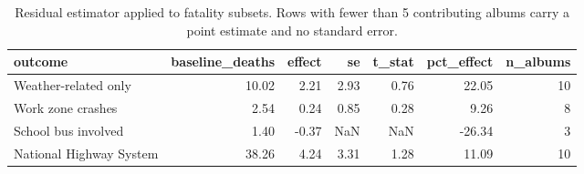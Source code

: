\begin{table}
\caption{Residual estimator applied to fatality subsets. Rows with fewer than 5 contributing albums carry a point estimate and no standard error.}
\begin{tabular}{lrrrrrr}
\toprule
outcome & baseline\_deaths & effect & se & t\_stat & pct\_effect & n\_albums \\
\midrule
Weather-related only & 10.02 & 2.21 & 2.93 & 0.76 & 22.05 & 10 \\
Work zone crashes & 2.54 & 0.24 & 0.85 & 0.28 & 9.26 & 8 \\
School bus involved & 1.40 & -0.37 & NaN & NaN & -26.34 & 3 \\
National Highway System & 38.26 & 4.24 & 3.31 & 1.28 & 11.09 & 10 \\
\bottomrule
\end{tabular}
\end{table}
